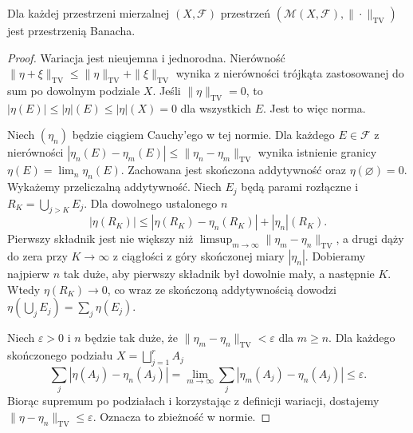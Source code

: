 \begin{twierdzenie}
\label{thm:complete-measures-16}
Dla każdej przestrzeni mierzalnej $(X,\mathcal F)$
przestrzeń $(\mathcal M(X,\mathcal F),\|\cdot\|_{\mathrm{TV}})$
jest przestrzenią Banacha.
\end{twierdzenie}
\begin{proof}
Wariacja jest nieujemna i jednorodna. Nierówność
$\|\eta+\xi\|_{\mathrm{TV}}\le\|\eta\|_{\mathrm{TV}}+
\|\xi\|_{\mathrm{TV}}$ wynika z nierówności trójkąta
zastosowanej do sum po dowolnym podziale $X$.
Jeśli $\|\eta\|_{\mathrm{TV}}=0$, to
$|\eta(E)|\le|\eta|(E)\le|\eta|(X)=0$ dla wszystkich $E$.
Jest to więc norma.

Niech $(\eta_n)$ będzie ciągiem Cauchy'ego w tej normie.
Dla każdego $E\in\mathcal F$ z nierówności
$|\eta_n(E)-\eta_m(E)|\le\|\eta_n-\eta_m\|_{\mathrm{TV}}$
wynika istnienie granicy $\eta(E)=\lim_n\eta_n(E)$.
Zachowana jest skończona addytywność oraz
$\eta(\varnothing)=0$. Wykażemy przeliczalną addytywność.
Niech $E_j$ będą parami rozłączne i
$R_K=\bigcup_{j>K}E_j$. Dla dowolnego ustalonego $n$
\[
|\eta(R_K)|\le|\eta(R_K)-\eta_n(R_K)|+|\eta_n|(R_K).
\]
Pierwszy składnik jest nie większy niż
$\limsup_{m\to\infty}\|\eta_m-\eta_n\|_{\mathrm{TV}}$,
a drugi dąży do zera przy $K\to\infty$ z ciągłości
z góry skończonej miary $|\eta_n|$. Dobieramy najpierw
$n$ tak duże, aby pierwszy składnik był dowolnie mały,
a następnie $K$. Wtedy $\eta(R_K)\to0$,
co wraz ze skończoną addytywnością dowodzi
$\eta(\bigcup_jE_j)=\sum_j\eta(E_j)$.

Niech $\varepsilon>0$ i $n$ będzie tak duże, że
$\|\eta_m-\eta_n\|_{\mathrm{TV}}<\varepsilon$ dla $m\ge n$.
Dla każdego skończonego podziału $X=\bigsqcup_{j=1}^rA_j$
\[
\sum_j|\eta(A_j)-\eta_n(A_j)|
=\lim_{m\to\infty}\sum_j|\eta_m(A_j)-\eta_n(A_j)|
\le\varepsilon.
\]
Biorąc supremum po podziałach i korzystając z definicji
wariacji, dostajemy $\|\eta-\eta_n\|_{\mathrm{TV}}
\le\varepsilon$. Oznacza to zbieżność w normie.
\end{proof}

